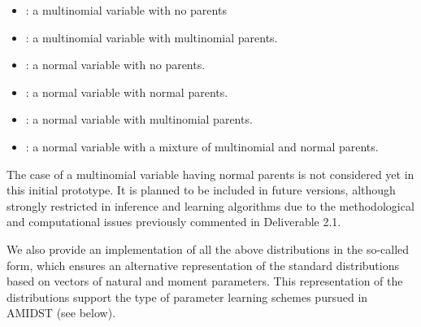 \begin{itemize}
  \item {}: a multinomial variable with no parents
  \item {}: a multinomial variable with multinomial parents.
  \item {}: a normal variable with no parents.
  \item {}: a normal variable with normal parents.
  \item {}: a normal variable with multinomial parents.
  \item {}: a normal variable with a mixture of multinomial and normal parents.
\end{itemize}

The case of a multinomial variable having normal parents is not considered yet in this initial prototype. It
is planned to be included in future versions, although strongly restricted in inference and learning
algorithms due to the methodological and computational issues previously commented in Deliverable 2.1. 

We also provide an implementation of all the above distributions in the so-called 
form, which ensures an alternative representation of the standard distributions based on vectors of natural
and moment parameters. This representation of the distributions support the type of parameter learning schemes
pursued in AMIDST (see below).


